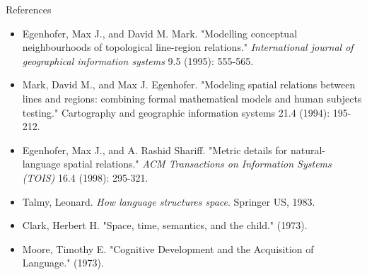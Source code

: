 \documentclass{beamer}
\begin{document}
	\begin{comment}
		- citing style chicago
		- sorted by relevance
	\end{comment}
	\begin{frame}[allowframebreaks]{References}
		\begin{itemize}
			\item Egenhofer, Max J., and David M. Mark. "Modelling conceptual neighbourhoods of topological line-region relations." \textit{International journal of geographical information systems} 9.5 (1995): 555-565.
			
			\item Mark, David M., and Max J. Egenhofer. "Modeling spatial relations between lines and regions: combining formal mathematical models and human subjects testing." Cartography and geographic information systems 21.4 (1994): 195-212.
			
			\item Egenhofer, Max J., and A. Rashid Shariff. "Metric details for natural-language spatial relations." \textit{ACM Transactions on Information Systems (TOIS)} 16.4 (1998): 295-321.

			\item Talmy, Leonard. \textit{How language structures space}. Springer US, 1983.
			
			\item Clark, Herbert H. "Space, time, semantics, and the child." (1973).

			\item Moore, Timothy E. "Cognitive Development and the Acquisition of Language." (1973).
		\end{itemize}
	\end{frame}
	
\end{document}
